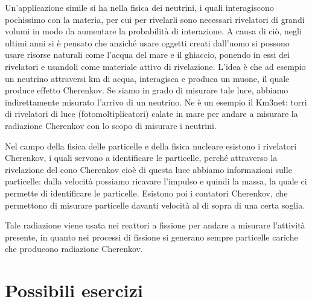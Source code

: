 Un'applicazione simile si ha nella fisica dei neutrini, i quali interagiscono pochissimo con la materia, per cui per rivelarli sono necessari rivelatori di grandi volumi in modo da aumentare la probabilità di interazione. A causa di ciò, negli ultimi anni si è pensato che anziché usare oggetti creati dall'uomo si possono usare risorse naturali come l'acqua del mare e il ghiaccio, ponendo in essi dei rivelatori e usandoli come materiale attivo di rivelazione. L'idea è che ad esempio un neutrino attraversi km di acqua, interagisca e produca un muone, il quale produce effetto Cherenkov. Se siamo in grado di misurare tale luce, abbiamo indirettamente misurato l'arrivo di un neutrino. Ne è un esempio il Km3net: torri di rivelatori di luce (fotomoltiplicatori) calate in mare per andare a misurare la radiazione Cherenkov con lo scopo di misurare i neutrini.

Nel campo della fisica delle particelle e della fisica nucleare esistono i rivelatori Cherenkov, i quali servono a identificare le particelle, perché attraverso la rivelazione del cono Cherenkov cioè di questa luce abbiamo informazioni sulle particelle: dalla velocità possiamo ricavare l'impulso e quindi la massa, la quale ci permette di identificare le particelle. Esistono poi i contatori Cherenkov, che permettono di misurare particelle davanti velocità al di sopra di una certa soglia.

Tale radiazione viene usata nei reattori a fissione per andare a misurare l'attività presente, in quanto nei processi di fissione si generano sempre particelle cariche che producono radiazione Cherenkov.

\section{Possibili esercizi}

